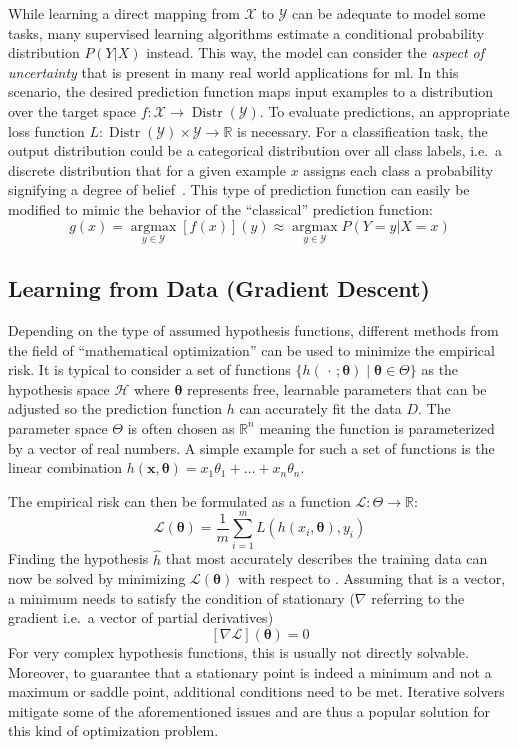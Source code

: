 While learning a direct mapping from $\mathcal{X}$ to $\mathcal{Y}$ can be adequate to model some tasks, many supervised learning algorithms estimate a conditional probability distribution $P(Y | X)$ instead.
This way, the model can consider the \textit{aspect of uncertainty} that is present in many real world applications for \gls{ml}.
In this scenario, the desired prediction function maps input examples to a distribution over the target space $f: \mathcal{X} \rightarrow \operatorname{Distr}(\mathcal{Y})$.
To evaluate predictions, an appropriate loss function $L: \operatorname{Distr}(\mathcal{Y}) \times \mathcal{Y} \rightarrow \mathbb{R}$ is necessary.
For a classification task, the output distribution could be a categorical distribution over all class labels, i.e.\ a discrete distribution that for a given example $x$ assigns each class a probability signifying a degree of belief~\autocite{Goodfellow-et-al-2016}.
This type of prediction function can easily be modified to mimic the behavior of the \enquote{classical} prediction function:
\[
    g(x) =\underset{y \in \mathcal{Y}}{\operatorname{argmax}} [f(x)](y) \approx \underset{y \in \mathcal{Y}}{\operatorname{argmax}} P(Y=y|X=x)
\]

\subsection{Learning from Data (Gradient Descent)}\label{subsec:learning-from-data}
Depending on the type of assumed hypothesis functions, different methods from the field of \enquote{mathematical optimization} can be used to minimize the empirical risk.
It is typical to consider a set of functions $\{h(\,\cdot\, ; \boldsymbol{\theta}) \mid \boldsymbol{\theta} \in \Theta \}$ as the hypothesis space $\mathcal{H}$ where $\boldsymbol{\theta}$ represents free, learnable parameters that can be adjusted so the prediction function $h$ can accurately fit the data $D$.
The parameter space $\Theta$ is often chosen as $\mathbb{R}^n$ meaning the function is parameterized by a vector of real numbers.
A simple example for such a set of functions is the linear combination $h(\boldsymbol{x}, \boldsymbol{\theta}) = x_1\theta_1 + \dots + x_n\theta_n$.

The empirical risk can then be formulated as a function $\mathcal{L}: \Theta \rightarrow \mathbb{R}$:
\[
    \mathcal{L}(\boldsymbol{\theta}) = \frac{1}{m}\sum_{i=1}^{m} L(h(x_i, \boldsymbol{\theta}), y_i)
\]
Finding the hypothesis $\hat{h}$ that most accurately describes the training data can now be solved by minimizing $\mathcal{L}(\boldsymbol{\theta})$ with respect to \boldsymbol{\theta}.
Assuming that \boldsymbol{\theta} is a vector, a minimum needs to satisfy the condition of stationary ($\nabla$ referring to the gradient i.e.\ a vector of partial derivatives)
\[
    [\nabla\mathcal{L}](\boldsymbol{\theta}) = 0
\]
For very complex hypothesis functions, this is usually not directly solvable.
Moreover, to guarantee that a stationary point is indeed a minimum and not a maximum or saddle point, additional conditions need to be met.
Iterative solvers mitigate some of the aforementioned issues and are thus a popular solution for this kind of optimization problem.


